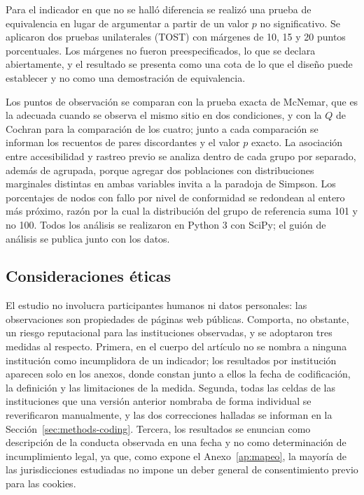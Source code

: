 \documentclass[pdflatex,sn-basic,Numbered]{sn-jnl}
\theoremstyle{thmstyleone}
\theoremstyle{thmstyletwo}
\theoremstyle{thmstylethree}
\begin{document}
Para el indicador en que no se hall\'o diferencia se realiz\'o una prueba de equivalencia en lugar de argumentar a partir de un valor $p$ no significativo. Se aplicaron dos pruebas unilaterales (TOST) con m\'argenes de 10, 15 y 20 puntos porcentuales. Los m\'argenes no fueron preespecificados, lo que se declara abiertamente, y el resultado se presenta como una cota de lo que el dise\~no puede establecer y no como una demostraci\'on de equivalencia.

Los puntos de observaci\'on se comparan con la prueba exacta de McNemar, que es la adecuada cuando se observa el mismo sitio en dos condiciones, y con la $Q$ de Cochran para la comparaci\'on de los cuatro; junto a cada comparaci\'on se informan los recuentos de pares discordantes y el valor $p$ exacto. La asociaci\'on entre accesibilidad y rastreo previo se analiza dentro de cada grupo por separado, adem\'as de agrupada, porque agregar dos poblaciones con distribuciones marginales distintas en ambas variables invita a la paradoja de Simpson. Los porcentajes de nodos con fallo por nivel de conformidad se redondean al entero m\'as pr\'oximo, raz\'on por la cual la distribuci\'on del grupo de referencia suma 101 y no 100. Todos los an\'alisis se realizaron en Python 3 con SciPy; el gui\'on de an\'alisis se publica junto con los datos.

\subsection{Consideraciones \'eticas}\label{sec:methods-ethics}

El estudio no involucra participantes humanos ni datos personales: las observaciones son propiedades de p\'aginas web p\'ublicas. Comporta, no obstante, un riesgo reputacional para las instituciones observadas, y se adoptaron tres medidas al respecto. Primera, en el cuerpo del art\'iculo no se nombra a ninguna instituci\'on como incumplidora de un indicador; los resultados por instituci\'on aparecen solo en los anexos, donde constan junto a ellos la fecha de codificaci\'on, la definici\'on y las limitaciones de la medida. Segunda, todas las celdas de las instituciones que una versi\'on anterior nombraba de forma individual se reverificaron manualmente, y las dos correcciones halladas se informan en la Secci\'on~\ref{sec:methods-coding}. Tercera, los resultados se enuncian como descripci\'on de la conducta observada en una fecha y no como determinaci\'on de incumplimiento legal, ya que, como expone el Anexo~\ref{ap:mapeo}, la mayor\'ia de las jurisdicciones estudiadas no impone un deber general de consentimiento previo para las cookies.
\end{document}
